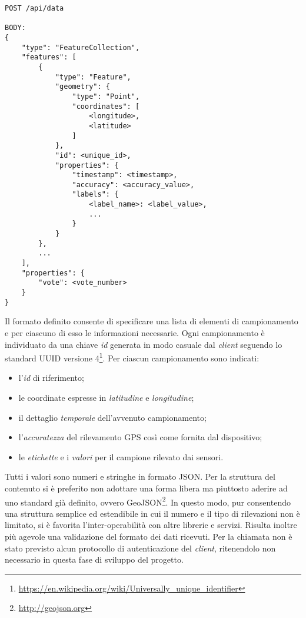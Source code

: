 \begin{lstlisting}[caption=Invocazione API di invio dati,label=response-data]
POST /api/data

BODY: 
{
    "type": "FeatureCollection",
    "features": [
        {
            "type": "Feature",
            "geometry": {
                "type": "Point",
                "coordinates": [
                    <longitude>,
                    <latitude>
                ]
            },
            "id": <unique_id>,
            "properties": {
                "timestamp": <timestamp>,
                "accuracy": <accuracy_value>,
                "labels": {
                    <label_name>: <label_value>,
                    ...
                }
            }
        },
        ...
    ],
    "properties": {
        "vote": <vote_number>
    }
}
\end{lstlisting}
 Il formato definito consente di specificare una lista di elementi di campionamento e per ciascuno di esso le informazioni necessarie. Ogni campionamento è individuato da una chiave \emph{id} generata in modo casuale dal \emph{client} seguendo lo standard UUID versione 4\footnote{\url{https://en.wikipedia.org/wiki/Universally_unique_identifier}}. Per ciascun campionamento sono indicati:
\begin{itemize}
	\item l'\emph{id} di riferimento;
	\item le coordinate espresse in \emph{latitudine} e \emph{longitudine};
	\item il dettaglio \emph{temporale} dell'avvenuto campionamento;
	\item l'\emph{accuratezza} del rilevamento GPS così come fornita dal dispositivo;
	\item le \emph{etichette} e i \emph{valori} per il campione rilevato dai sensori.
\end{itemize}
Tutti i valori sono numeri e stringhe in formato JSON. Per la struttura del contenuto si è preferito non adottare una forma libera ma piuttosto aderire ad uno standard già definito, ovvero GeoJSON\footnote{\url{http://geojson.org}}. In questo modo, pur consentendo una struttura semplice ed estendibile in cui il numero e il tipo di rilevazioni non è limitato, si è favorita l'inter-operabilità con altre librerie e servizi. Risulta inoltre più agevole una validazione del formato dei dati ricevuti.
Per la chiamata non è stato previsto alcun protocollo di autenticazione del \emph{client}, ritenendolo non necessario in questa fase di sviluppo del progetto.

